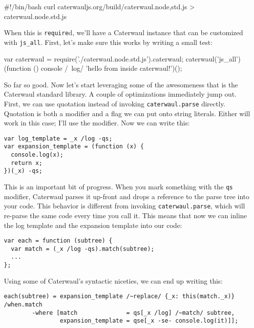 \documentclass{report}
\begin{document}
\begin{resourcecode}
#!/bin/bash
curl caterwauljs.org/build/caterwaul.{node,std}.js > caterwaul.node.std.js \end{resourcecode}

    When this is {\tt require}d, we'll have a Caterwaul instance that can be customized with \verb|js_all|. First, let's make sure this works by writing a small test:

\begin{resourcecode}
var caterwaul = require('./caterwaul.node.std.js').caterwaul;
caterwaul('js_all')(function () {
  console /~log/ 'hello from inside caterwaul!'})(); \end{resourcecode}

    So far so good. Now let's start leveraging some of the awesomeness that is the Caterwaul standard library. A couple of optimizations immediately jump out. First, we can use quotation
    instead of invoking {\tt caterwaul.parse} directly. Quotation is both a modifier and a flag we can put onto string literals. Either will work in this case; I'll use the modifier. Now we
    can write this:

\begin{verbatim}
var log_template = _x /log -qs;
var expansion_template = (function (x) {
  console.log(x);
  return x;
})(_x) -qs;
\end{verbatim}

    This is an important bit of progress. When you mark something with the {\tt qs} modifier, Caterwaul parses it up-front and drops a reference to the parse tree into your code. This behavior
    is different from invoking {\tt caterwaul.parse}, which will re-parse the same code every time you call it. This means that now we can inline the log template and the expansion template
    into our code:

\begin{verbatim}
var each = function (subtree) {
  var match = (_x /log -qs).match(subtree);
  ...
};
\end{verbatim}

    Using some of Caterwaul's syntactic niceties, we can end up writing this:

\begin{verbatim}
each(subtree) = expansion_template /~replace/ {_x: this(match._x)} /when.match
        -where [match              = qs[_x /log] /~match/ subtree,
                expansion_template = qse[_x -se- console.log(it)]];
\end{verbatim}
\end{document}
